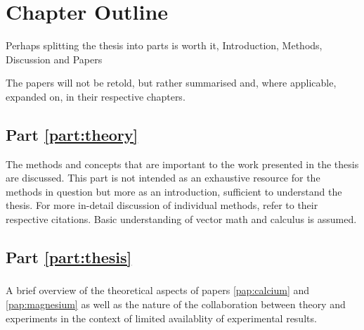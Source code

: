 \section{Chapter Outline}
\label{sec:chapters}

Perhaps splitting the thesis into parts is worth it, Introduction, Methods, Discussion and Papers

The papers will not be retold, but rather summarised and, where applicable, expanded on, in their respective chapters.

\subsection*{Part \ref{part:theory}}
The methods and concepts that are important to the work presented in the thesis are discussed.
This part is not intended as an exhaustive resource for the methods in question but more as an introduction, sufficient to understand the thesis.
For more in-detail discussion of individual methods, refer to their respective citations.
Basic understanding of vector math and calculus is assumed.

\subsubsection{}
\placeholder

\subsubsection{}
\placeholder

\subsubsection{}
\placeholder

\subsection*{Part \ref{part:thesis}}
\subsubsection{}
A brief overview of the theoretical aspects of papers \ref{pap:calcium} and \ref{pap:magnesium} as well as the nature of the collaboration between theory and experiments in the context of limited availablity of experimental results.


